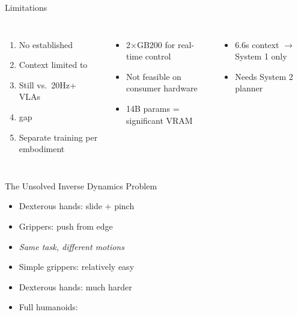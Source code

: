 \begin{frame}{Limitations}
\begin{columns}[T]
\begin{enumerate}
    \item No established 
    \item Context limited to 
    \item Still  vs.\ 20Hz+ VLAs
    \item {} gap
    \item Separate training per embodiment
\end{enumerate}

\begin{itemize}
    \item 2$\times$GB200 for real-time control
    \item Not feasible on consumer hardware
    \item 14B params = significant VRAM
\end{itemize}

\vspace{0.3em}
\begin{itemize}
    \item 6.6s context $\rightarrow$ System 1 only
    \item Needs System 2 planner
\end{itemize}
\end{columns}
\end{frame}

\begin{frame}{The Unsolved Inverse Dynamics Problem}

\vspace{0.5em}
\begin{itemize}
    \item Dexterous hands: slide + pinch
    \item Grippers: push from edge
    \item \emph{Same task, different motions}
\end{itemize}

\vspace{0.5em}
\begin{itemize}
    \item Simple grippers: relatively easy
    \item Dexterous hands: much harder
    \item Full humanoids: 
\end{itemize}
\end{frame}

